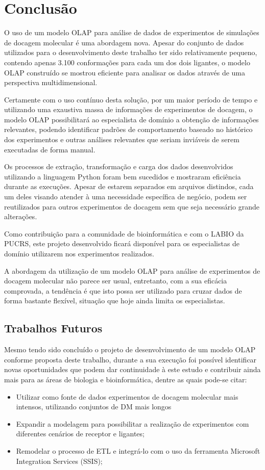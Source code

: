 \chapter{Conclusão}

O uso de um modelo OLAP para análise de dados de experimentos de simulações de docagem molecular é uma abordagem nova. Apesar do conjunto de dados utilizados para o desenvolvimento deste trabalho ter sido relativamente pequeno, contendo apenas 3.100 conformações para cada um dos dois ligantes, o modelo OLAP construído se mostrou eficiente para analisar os dados através de uma perspectiva multidimensional.

Certamente com o uso contínuo desta solução, por um maior período de tempo e utilizando uma exaustiva massa de informações de experimentos de docagem, o modelo OLAP possibilitará ao especialista de domínio a obtenção de informações relevantes, podendo identificar padrões de comportamento baseado no histórico dos experimentos e outras análises relevantes que seriam inviáveis de serem executadas de forma manual.

Os processos de extração, transformação e carga dos dados desenvolvidos utilizando a linguagem Python foram bem sucedidos e mostraram eficiência durante as execuções. Apesar de estarem separados em arquivos distindos, cada um deles visando atender à uma necessidade específica de negócio, podem ser reutilizados para outros experimentos de docagem sem que seja necessário grande alterações.

Como contribuição para a comunidade de bioinformática e com o LABIO da PUCRS, este projeto desenvolvido ficará disponível para os especialistas de domínio utilizarem nos experimentos realizados.

A abordagem da utilização de um modelo OLAP para análise de experimentos de docagem molecular não parece ser usual, entretanto, com a sua eficácia comprovada, a tendência é que isto possa ser utilizado para cruzar dados de forma bastante flexível, situação que hoje ainda limita os especialistas.

\section{Trabalhos Futuros}
	Mesmo tendo sido concluído o projeto de desenvolvimento de um modelo OLAP conforme proposta deste trabalho, durante a sua execução foi possível identificar novas oportunidades que podem dar continuidade à este estudo e contribuir ainda mais para as áreas de biologia e bioinformática, dentre as quais pode-se citar:

\begin{itemize}
 	\item Utilizar como fonte de dados experimentos de docagem molecular mais intensos, utilizando conjuntos de DM mais longos
 	\item Expandir a modelagem para possibilitar a realização de experimentos com diferentes cenários de receptor e ligantes;
 	\item Remodelar o processo de ETL e integrá-lo com o uso da ferramenta Microsoft Integration Services (SSIS);
\end{itemize}



